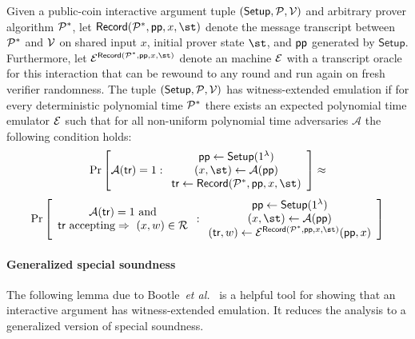 \begin{definition}\label{def:wee}
Given a public-coin interactive argument tuple $(\textsf{Setup}, \mathcal{P}, \mathcal{V})$ and arbitrary prover algorithm $\mathcal{P}^*$, let $\textsf{Record}(\prover^*, \params, x, \st)$ denote the message transcript between $\mathcal{P}^*$ and $\mathcal{V}$ on shared input $x$, initial prover state $\st$, and $\textsf{pp}$ generated by $\textsf{Setup}$. Furthermore, let $\emu^{\textsf{Record}(\prover^*, \params, x, \st)}$ denote an machine $\mathcal{E}$ with a transcript oracle for this interaction that can be rewound to any round and run again on fresh verifier randomness. The tuple $(\textsf{Setup}, \mathcal{P}, \mathcal{V})$ has witness-extended emulation if for every deterministic polynomial time $\mathcal{P}^*$ there exists an expected polynomial time emulator $\mathcal{E}$ such that for all non-uniform polynomial time adversaries $\mathcal{A}$ the following condition holds: 
\[
\Pr \left[
\mathcal{A}(\textsf{tr}) = 1
:
\begin{array}{c}
             \params \leftarrow \textsf{Setup}(1^\lambda) \\
             (x, \st) \leftarrow \mathcal{A}(\params) \\
             \tr \leftarrow \textsf{Record}(\prover^*, \params, x, \st)
\end{array} 
\right] \approx
\]
\[
\Pr \left[
\begin{array}{c} 
\mathcal{A}(\textsf{tr}) = 1 \ \text{and} \\ 
\text{\tr~accepting} \Rightarrow \ (x, w) \in \mathcal{R}
\end{array} 
:
\begin{array}{c}
             \params \leftarrow \textsf{Setup}(1^\lambda) \\
             (x, \st) \leftarrow \mathcal{A}(\params) \\
(\textsf{tr}, w) \leftarrow \emu^{\textsf{Record}(\prover^*, \params, x, \st)}(\params, x)
\end{array}
\right]
\]

\end{definition}

\paragraph{Generalized special soundness} The following lemma due to Bootle~\emph{et al.}~\cite{EC:BCCGP16} is a helpful tool for showing that an interactive argument has witness-extended emulation. It reduces the analysis to a generalized version of special soundness. 

